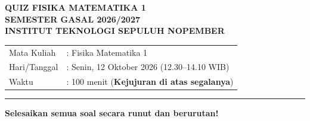 \documentclass[11pt,a4paper]{article}
\begin{document}
\begin{center}
    {\large\bfseries QUIZ FISIKA MATEMATIKA 1}\\
    {\bfseries SEMESTER GASAL 2026/2027}\\
    {\bfseries INSTITUT TEKNOLOGI SEPULUH NOPEMBER}
\end{center}
\begin{tabular}{@{}ll@{}}
    Mata Kuliah  & : Fisika Matematika 1 \\
    Hari/Tanggal & : Senin, 12 Oktober 2026 (12.30--14.10 WIB) \\
    Waktu        & : 100 menit (\textbf{Kejujuran di atas segalanya})
\end{tabular}

\smallskip
\hrule
\medskip
\textbf{Selesaikan semua soal secara runut dan berurutan!}
\end{document}
